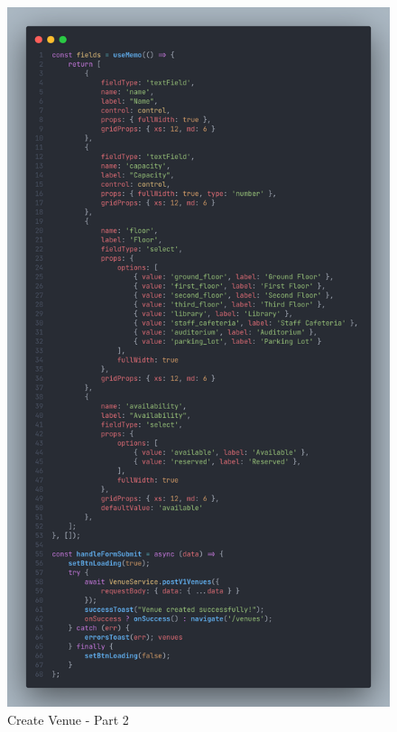 \begin{justify}
\begin{itemize}
                \begin{figure}[H]
                    \centerline{\includegraphics[width=132mm,scale=1]{figures/implementation_and_testing/implementation/frontend/create_venue-2.png}}
                    \caption{Create Venue - Part 2}
                \end{figure}
    

\end{itemize}
\end{justify}
